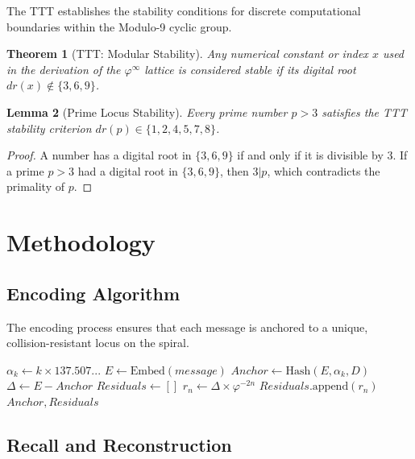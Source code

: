 \documentclass[11pt,a4paper,oneside]{article}
\newtheorem{theorem}{Theorem}[section]
\newtheorem{lemma}[theorem]{Lemma}
\theoremstyle{definition}
\theoremstyle{remark}
\newcommand{\phiinf}{\varphi^\infty}
\begin{document}
The TTT establishes the stability conditions for discrete computational boundaries within the Modulo-9 cyclic group.

\begin{theorem}[TTT: Modular Stability]
\label{thm:ttt}
Any numerical constant or index $x$ used in the derivation of the $\phiinf$ lattice is considered stable if its digital root $dr(x) \notin \{3, 6, 9\}$. 
\end{theorem}

\begin{lemma}[Prime Locus Stability]
Every prime number $p > 3$ satisfies the TTT stability criterion $dr(p) \in \{1, 2, 4, 5, 7, 8\}$.
\end{lemma}

\begin{proof}
A number has a digital root in $\{3, 6, 9\}$ if and only if it is divisible by 3. If a prime $p > 3$ had a digital root in $\{3, 6, 9\}$, then $3|p$, which contradicts the primality of $p$.
\end{proof}

\section{Methodology}

\subsection{Encoding Algorithm}

The encoding process ensures that each message is anchored to a unique, collision-resistant locus on the spiral.

\begin{algorithm}
\caption{$\phiinf$ Hierarchical Encoding}
\begin{algorithmic}[1]
    \State $\alpha_k \gets k \times 137.507...$
    \State $E \gets \text{Embed}(message)$
    \State $Anchor \gets \text{Hash}(E, \alpha_k, D)$ 
    \State $\Delta \gets E - Anchor$
    \State $Residuals \gets []$
        \State $r_n \gets \Delta \times \varphi^{-2n}$
        \State $Residuals.\text{append}(r_n)$
    \EndFor
    \State \Return $Anchor, Residuals$
\EndProcedure
\end{algorithmic}
\end{algorithm}

\subsection{Recall and Reconstruction}
\end{document}
